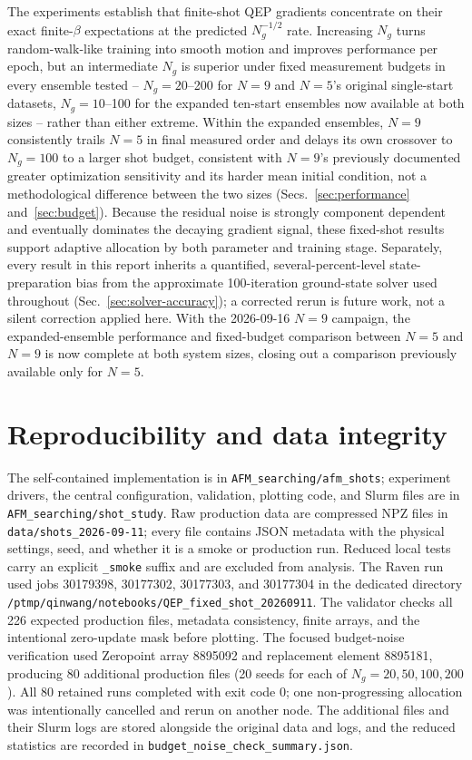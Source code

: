 \documentclass[11pt]{article}
\begin{document}
The experiments establish that finite-shot QEP gradients concentrate on their exact
finite-$\beta$ expectations at the predicted $N_g^{-1/2}$ rate.  Increasing $N_g$
turns random-walk-like training into smooth motion and improves performance per epoch,
but an intermediate $N_g$ is superior under fixed measurement budgets in every
ensemble tested -- $N_g=20$--200 for $N=9$ and $N=5$'s original single-start
datasets, $N_g=10$--100 for the expanded ten-start ensembles now available at both
sizes -- rather than either extreme.  Within the expanded ensembles, $N=9$
consistently trails $N=5$ in final measured order and delays its own crossover to
$N_g=100$ to a larger shot budget, consistent with $N=9$'s previously documented
greater optimization sensitivity and its harder mean initial condition, not a
methodological difference between the two sizes (Secs.~\ref{sec:performance}
and~\ref{sec:budget}).  Because the residual noise is strongly component dependent
and eventually dominates the decaying gradient signal, these fixed-shot results
support adaptive allocation by both parameter and training stage.  Separately, every
result in this report inherits a quantified, several-percent-level state-preparation
bias from the approximate 100-iteration ground-state solver used throughout
(Sec.~\ref{sec:solver-accuracy}); a corrected rerun is future work, not a silent
correction applied here.  With the 2026-09-16 $N=9$ campaign, the expanded-ensemble
performance and fixed-budget comparison between $N=5$ and $N=9$ is now complete at
both system sizes, closing out a comparison previously available only for $N=5$.

\section{Reproducibility and data integrity}
\label{sec:reproducibility}

The self-contained implementation is in \texttt{AFM\_searching/afm\_shots}; experiment
drivers, the central configuration, validation, plotting code, and Slurm files are in
\texttt{AFM\_searching/shot\_study}.  Raw production data are compressed NPZ files in
\texttt{data/shots\_2026-09-11}; every file contains JSON metadata with the physical
settings, seed, and whether it is a smoke or production run. Reduced local tests carry
an explicit \texttt{\_smoke} suffix and are excluded from analysis.  The Raven run used
  jobs 30179398, 30177302, 30177303, and 30177304 in the dedicated directory
\texttt{/ptmp/qinwang/notebooks/QEP\_fixed\_shot\_20260911}.  The validator checks all
226 expected production files, metadata consistency, finite arrays, and the intentional
zero-update mask before plotting.  The focused budget-noise verification used Zeropoint
array 8895092 and replacement element 8895181, producing 80 additional production files
(20 seeds for each of $N_g=20,50,100,200$).  All 80 retained runs completed with exit
code 0; one non-progressing allocation was intentionally cancelled and rerun on another
node.  The additional files and their Slurm logs are stored alongside the original data
and logs, and the reduced statistics are recorded in
\texttt{budget\_noise\_check\_summary.json}.
\end{document}
